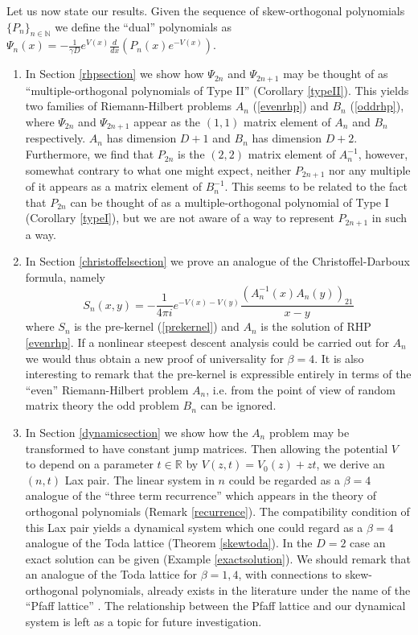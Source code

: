\documentclass[12pt]{article}
\theoremstyle{definition}
\begin{document}
Let us now state our results.  Given the sequence of skew-orthogonal polynomials $\{ P_n \}_{n \in \mathbb{N}}$ we define the \enquote{dual} polynomials as $\Psi_n(x) =  - \frac{1}{\gamma D} e^{V(x)} \frac{d}{dx}\left( P_{n}(x) e^{-V(x)} \right)$.
\begin{enumerate}
\item In Section \ref{rhpsection} we show how $\Psi_{2n}$ and $\Psi_{2n+1}$ may be thought of as \enquote{multiple-orthogonal polynomials of Type II} (Corollary \ref{typeII}). This yields two families of Riemann-Hilbert problems $A_n$ (\ref{evenrhp}) and $B_n$ (\ref{oddrhp}),  where $\Psi_{2n}$ and $\Psi_{2n+1}$ appear as the $(1,1)$ matrix element of $A_n$ and $B_n$ respectively.  $A_n$ has dimension $D+1$ and $B_n$ has dimension $D+2$. Furthermore, we find that $P_{2n}$ is the $(2,2)$ matrix element of $A_n^{-1}$,  however, somewhat contrary to what one might expect,  neither $P_{2n+1}$ nor any multiple of it appears as a matrix element of $B_n^{-1}$.  This seems to be related to the fact that $P_{2n}$ can be thought of as a multiple-orthogonal polynomial of Type I (Corollary \ref{typeI}), but we are not aware of a way to represent $P_{2n+1}$ in such a way.
\item In Section \ref{christoffelsection} we prove an analogue of the Christoffel-Darboux formula, namely
\begin{equation}
\boxed{S_n(x,y) = - \frac{1}{4\pi i} e^{-V(x) - V(y)} \frac{\left( A_n^{-1}(x) A_n(y) \right)_{21}}{x-y} }
\end{equation}
where $S_n$ is the pre-kernel (\ref{prekernel}) and $A_n$ is the solution of RHP \ref{evenrhp}. If a nonlinear steepest descent analysis could be carried out for $A_n$ we would thus obtain a new proof of universality for $\beta = 4$. It is also interesting to remark that the pre-kernel is expressible entirely in terms of the \enquote{even} Riemann-Hilbert problem $A_n$, i.e. from the point of view of random matrix theory the odd problem $B_n$ can be ignored.
\item In Section \ref{dynamicsection} we show how the $A_n$ problem may be transformed to have constant jump matrices.  Then allowing the potential $V$ to depend on a parameter $t \in \mathbb{R}$ by $V(z,t) = V_0(z) + zt$, we derive an $(n,t)$ Lax pair. The linear system in $n$ could be regarded as a $\beta = 4$ analogue of the \enquote{three term recurrence} which appears in the theory of orthogonal polynomials (Remark \ref{recurrence}). The compatibility condition of this Lax pair yields a dynamical system which one could regard as a $\beta=4$ analogue of the Toda lattice (Theorem \ref{skewtoda}). In the $D=2$ case an exact solution can be given (Example \ref{exactsolution}).  We should remark that an analogue of the Toda lattice for $\beta = 1,4$, with connections to skew-orthogonal polynomials, already exists in the literature under the name of the \enquote{Pfaff lattice} \cite{Adler1999ThePL}.  The relationship between the Pfaff lattice and our dynamical system is left as a topic for future investigation. 
\end{enumerate}
\end{document}
